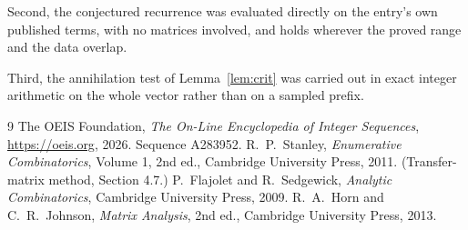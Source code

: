 \documentclass[11pt,a4paper]{article}
\theoremstyle{plain}
\theoremstyle{definition}
\begin{document}
Second, the conjectured recurrence was evaluated directly on the entry's own published terms,
with no matrices involved, and holds wherever the proved range and the data overlap.

Third, the annihilation test of Lemma~\ref{lem:crit} was carried out in exact integer
arithmetic on the whole vector rather than on a sampled prefix.

\begin{thebibliography}{9}
 The OEIS Foundation, \emph{The On-Line Encyclopedia of Integer
Sequences}, \url{https://oeis.org}, 2026. Sequence A283952.
 R.~P.~Stanley, \emph{Enumerative Combinatorics}, Volume 1, 2nd ed.,
Cambridge University Press, 2011. (Transfer-matrix method, Section 4.7.)
 P.~Flajolet and R.~Sedgewick, \emph{Analytic Combinatorics}, Cambridge
University Press, 2009.
 R.~A.~Horn and C.~R.~Johnson, \emph{Matrix Analysis}, 2nd ed., Cambridge
University Press, 2013.
\end{thebibliography}
\end{document}
